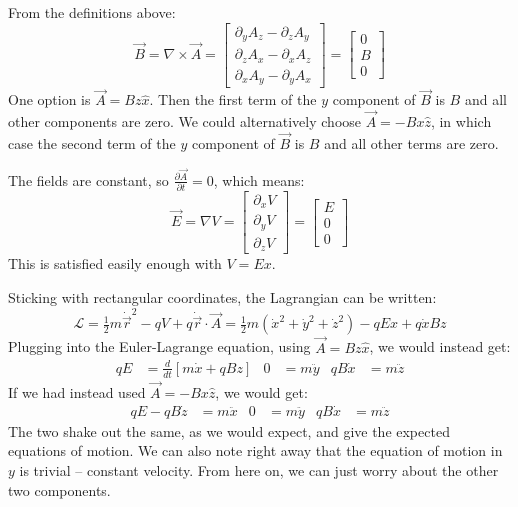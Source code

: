 \documentclass[12pt]{article}
\newcommand{\purple}[1]{{\color{purple} #1}}
\begin{document}
\purple{

From the definitions above:
$$
\vec{B}
=
\nabla \times \vec{A}
=
\left[
{\begin{array}{c}
    \partial_y A_z - \partial_z A_y \\
    \partial_z A_x - \partial_x A_z \\
    \partial_x A_y - \partial_y A_x
\end{array} }
\right]
=
\left[
{\begin{array}{c}
    0 \\
    B \\
    0
\end{array} }
\right]
$$
One option is $\vec{A}=Bz\hat{x}$. Then the first term of the $y$ component of $\vec{B}$ is $B$ and all other components are zero. We could alternatively choose $\vec{A}=-Bx\hat{z}$, in which case the second term of the $y$ component of $\vec{B}$ is $B$ and all other terms are zero.

The fields are constant, so $\frac{\partial \vec{A}}{\partial t}=0$, which means:
$$
\vec{E}
=
\nabla V
=
\left[
{\begin{array}{c}
    \partial_x V \\
    \partial_y V \\
    \partial_z V
\end{array} }
\right]
=
\left[
{\begin{array}{c}
    E \\
    0 \\
    0
\end{array} }
\right]
$$
This is satisfied easily enough with $V=Ex$. 

Sticking with rectangular coordinates, the Lagrangian can be written:
$$
\mathcal{L}
=
\tfrac{1}{2} m \dot{\vec{r}}^2 - qV + q\dot{\vec{r}}\cdot\vec{A}
=
\tfrac{1}{2} m (\dot{x}^2 + \dot{y}^2 + \dot{z}^2) - qEx + q\dot{x}Bz 
$$
Plugging into the Euler-Lagrange equation, using $\vec{A}=Bz\hat{x}$, we would instead get:
\begin{align*}
    qE &= \frac{d}{dt} \left[ m\dot{x} + qBz\right] &
    0 &= m \ddot{y} &
    qB\dot{x} &= m \ddot{z}
\end{align*}
If we had instead used $\vec{A}=-Bx\hat{z}$, we would get:
\begin{align*}
    qE - qB\dot{z} &= m\ddot{x}&
    0 &= m \ddot{y} &
    qB\dot{x} &= m \ddot{z}
\end{align*}
The two shake out the same, as we would expect, and give the expected equations of motion. We can also note right away that the equation of motion in $y$ is trivial -- constant velocity. From here on, we can just worry about the other two components. 

}
\end{document}
